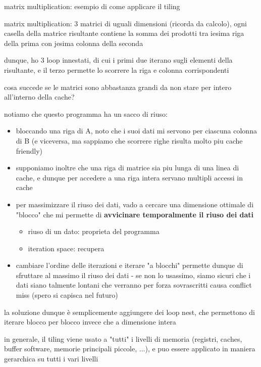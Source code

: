 matrix multiplication: esempio di come applicare il tiling
\begin{example}
    matrix multiplication: 3 matrici di uguali dimensioni (ricorda da calcolo), ogni casella della matrice risultante contiene la somma dei prodotti tra iesima riga della prima con jesima colonna della seconda
    
    dunque, ho 3 loop innestati, di cui i primi due iterano sugli elementi della risultante, e il terzo permette lo scorrere la riga e colonna corrispondenti

    cosa succede se le matrici sono abbastanza grandi da non stare per intero all'interno della cache?

    notiamo che questo programma ha un sacco di riuso:
    \begin{itemize}
      \item bloccando una riga di A, noto che i suoi dati mi servono per ciascuna colonna di B (e viceversa, ma sappiamo che scorrere righe risulta molto piu cache friendly)
      \item supponiamo inoltre che una riga di matrice sia piu lunga di una linea di cache, e dunque per accedere a una riga intera servano multipli accessi in cache
      \item per massimizzare il riuso dei dati, vado a cercare una dimensione ottimale di "blocco" che mi permette di \textbf{avvicinare temporalmente il riuso dei dati}
      \begin{itemize}
        \item riuso di un dato: proprieta del programma
        \item iteration space: recupera
      \end{itemize}

    \item cambiare l'ordine delle iterazioni e iterare "a blocchi" permette dunque di sfruttare al massimo il riuso dei dati - se non lo usassimo, siamo sicuri che i dati siano talmente lontani che verranno per forza sovrascritti causa conflict miss (spero si capisca nel futuro)
    \end{itemize}

    la soluzione dunque \`e semplicemente aggiungere dei loop nest, che permettono di iterare blocco per blocco invece che a dimensione intera
    
\end{example}

in generale, il tiling viene usato a "tutti" i livelli di memoria (registri, caches, buffer software, memorie principali piccole, ...), e puo essere applicato in maniera gerarchica su tutti i vari livelli

